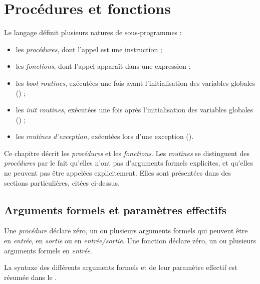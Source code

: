 




\chapter{Procédures et fonctions}

Le langage définit plusieurs natures de sous-programmes :
\begin{itemize}
  \item les \emph{procédures}, dont l'appel est une instruction ;
  \item les \emph{fonctions}, dont l'appel apparaît dans une expression ;
  \item les \emph{boot routines}, exécutées une fois avant l'initialisation des variables globales () ;
  \item les \emph{init routines}, exécutées une fois après l'initialisation des variables globales () ;
  \item les \emph{routines d'exception}, exécutées lors d'une exception ().
\end{itemize}

Ce chapitre décrit les \emph{procédures} et les \emph{fonctions}. Les \emph{routines} se distinguent des \emph{procédures} par le fait qu'elles n'ont pas d'arguments formels explicites, et qu'elles ne peuvent pas être appelées explicitement. Elles sont présentées dans des sections particulières, citées ci-dessus.

\section{Arguments formels et paramètres effectifs}


Une \emph{procédure} déclare zéro, un ou plusieurs arguments formels qui peuvent être en \emph{entrée}, en \emph{sortie} ou en \emph{entrée/sortie}. Une fonction déclare zéro, un ou plusieurs arguments formels en \emph{entrée}.

La syntaxe des différents arguments formels et de leur paramètre effectif est résumée dans le .


